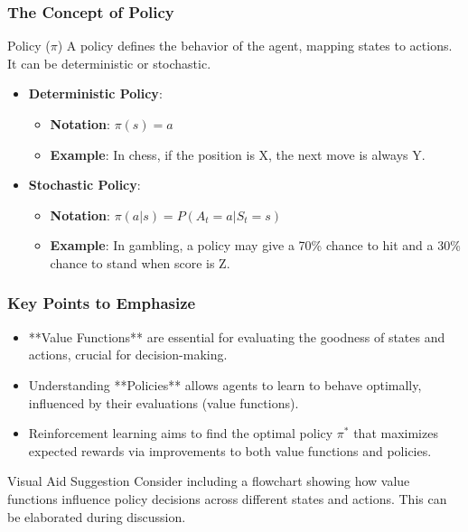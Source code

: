 \documentclass[aspectratio=169]{beamer}
\begin{document}
\begin{frame}[fragile]
    \frametitle{The Concept of Policy}
    \begin{block}{Policy (\(\pi\))}
        A policy defines the behavior of the agent, mapping states to actions. It can be deterministic or stochastic.
    \end{block}

    \begin{itemize}
        \item \textbf{Deterministic Policy}:
        \begin{itemize}
            \item \textbf{Notation}: \(\pi(s) = a\)
            \item \textbf{Example}: In chess, if the position is X, the next move is always Y.
        \end{itemize}
        
        \item \textbf{Stochastic Policy}:
        \begin{itemize}
            \item \textbf{Notation}: \(\pi(a|s) = P(A_t = a | S_t = s)\)
            \item \textbf{Example}: In gambling, a policy may give a 70\% chance to hit and a 30\% chance to stand when score is Z.
        \end{itemize}
    \end{itemize}
\end{frame}

\begin{frame}[fragile]
    \frametitle{Key Points to Emphasize}
    \begin{itemize}
        \item **Value Functions** are essential for evaluating the goodness of states and actions, crucial for decision-making.
        \item Understanding **Policies** allows agents to learn to behave optimally, influenced by their evaluations (value functions).
        \item Reinforcement learning aims to find the optimal policy \(\pi^*\) that maximizes expected rewards via improvements to both value functions and policies.
    \end{itemize}
    
    \begin{block}{Visual Aid Suggestion}
        Consider including a flowchart showing how value functions influence policy decisions across different states and actions. This can be elaborated during discussion.
    \end{block}
\end{frame}
\end{document}
